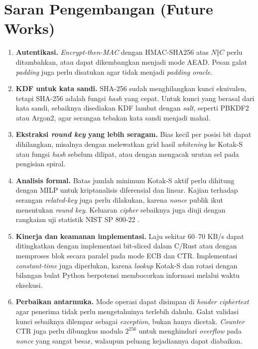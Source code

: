 \section{Saran Pengembangan (Future Works)}
\label{sec:saran}
\begin{enumerate}
    \item \textbf{Autentikasi.} \textit{Encrypt-then-MAC} dengan HMAC-SHA256 atas $N \Vert C$ perlu ditambahkan, atau \algname{} dapat dikembangkan menjadi mode AEAD. Pesan galat \textit{padding} juga perlu disatukan agar tidak menjadi \textit{padding oracle}.
    \item \textbf{KDF untuk kata sandi.} SHA-256 sudah menghilangkan kunci ekuivalen, tetapi SHA-256 adalah fungsi \textit{hash} yang cepat. Untuk kunci yang berasal dari kata sandi, sebaiknya disediakan KDF lambat dengan \textit{salt}, seperti PBKDF2 atau Argon2, agar serangan tebakan kata sandi menjadi mahal.
    \item \textbf{Ekstraksi \textit{round key} yang lebih seragam.} Bias kecil per posisi bit dapat dihilangkan, misalnya dengan melewatkan grid hasil \textit{whitening} ke Kotak-S atau fungsi \textit{hash} sebelum dilipat, atau dengan mengacak urutan sel pada pengisian spiral.
    \item \textbf{Analisis formal.} Batas jumlah minimum Kotak-S aktif perlu dihitung dengan MILP untuk kriptanalisis diferensial dan linear. Kajian terhadap serangan \textit{related-key} juga perlu dilakukan, karena \textit{nonce} publik ikut menentukan \textit{round key}. Keluaran \textit{cipher} sebaiknya juga diuji dengan rangkaian uji statistik NIST SP 800-22 \cite{rukhin2010}.
    \item \textbf{Kinerja dan keamanan implementasi.} Laju sekitar 60--70 KB/s dapat ditingkatkan dengan implementasi bit-sliced dalam C/Rust atau dengan memproses blok secara paralel pada mode ECB dan CTR. Implementasi \textit{constant-time} juga diperlukan, karena \textit{lookup} Kotak-S dan rotasi dengan bilangan bulat Python berpotensi membocorkan informasi melalui waktu eksekusi.
    \item \textbf{Perbaikan antarmuka.} Mode operasi dapat disimpan di \textit{header ciphertext} agar penerima tidak perlu mengetahuinya terlebih dahulu. Galat validasi kunci sebaiknya dilempar sebagai \textit{exception}, bukan hanya dicetak. \textit{Counter} CTR juga perlu dibungkus modulo $2^{256}$ untuk menghindari \textit{overflow} pada \textit{nonce} yang sangat besar, walaupun peluang kejadiannya dapat diabaikan.
\end{enumerate}
